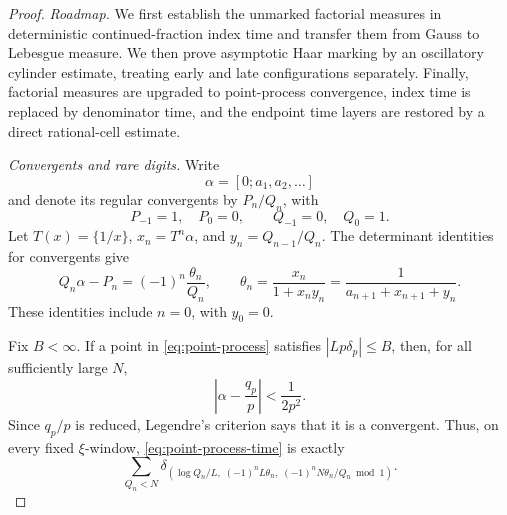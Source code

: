 \documentclass[11pt]{article}
\numberwithin{equation}{section}
\theoremstyle{definition}
\newcommand{\1}{\mathbf 1}
\begin{document}
\begin{proof}
\emph{Roadmap.}
We first establish the unmarked factorial measures in deterministic
continued-fraction index time and transfer them from Gauss to Lebesgue
measure.  We then prove asymptotic Haar marking by an oscillatory
cylinder estimate, treating early and late configurations separately.
Finally, factorial measures are upgraded to point-process convergence,
index time is replaced by denominator time, and the endpoint time layers
are restored by a direct rational-cell estimate.

\medskip
\emph{Convergents and rare digits.}
Write
\[
 \alpha=[0;a_1,a_2,\ldots]
\]
and denote its regular convergents by \(P_n/Q_n\), with
\[
 P_{-1}=1,\quad P_0=0,\qquad Q_{-1}=0,\quad Q_0=1.
\]
Let \(T(x)=\{1/x\}\), \(x_n=T^n\alpha\), and
\(y_n=Q_{n-1}/Q_n\).  The determinant identities for convergents give
\begin{equation}\label{eq:cf-error}
 Q_n\alpha-P_n=(-1)^n\frac{\theta_n}{Q_n},\qquad
 \theta_n=\frac{x_n}{1+x_ny_n}
 =\frac1{a_{n+1}+x_{n+1}+y_n}.
\end{equation}
These identities include \(n=0\), with \(y_0=0\).

Fix \(B<\infty\).  If a point in \eqref{eq:point-process} satisfies
\(|Lp\delta_p|\le B\), then, for all sufficiently large \(N\),
\[
 \left|\alpha-\frac{q_p}{p}\right|
 <\frac1{2p^2}.
\]
Since \(q_p/p\) is reduced, Legendre's criterion
\cite[Chapter~II, \S7, Theorem~19, p.~30]{Khinchin} says that it is a
convergent.  Thus, on
every fixed \(\xi\)-window, \eqref{eq:point-process-time} is exactly
\begin{equation}\label{eq:cf-process}
 \sum_{Q_n<N}
 \delta_{\left(\log Q_n/L,\;(-1)^nL\theta_n,\;
              (-1)^nN\theta_n/Q_n\bmod1\right)}.
\end{equation}


\end{proof}
\end{document}
